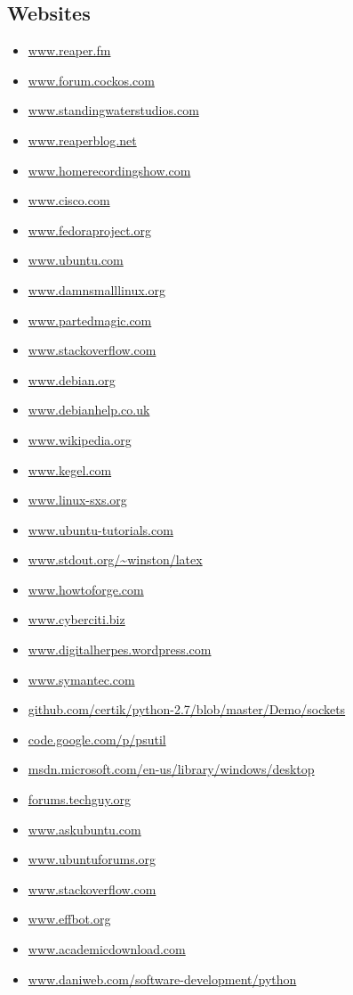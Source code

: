 \documentclass[DIV=calc]{scrartcl}
\begin{document}
\subsection{Websites}
\begin{itemize}
	\item \url{www.reaper.fm}
	\item \url{www.forum.cockos.com}
	\item \url{www.standingwaterstudios.com}
	\item \url{www.reaperblog.net}
	\item \url{www.homerecordingshow.com}
	\item \url{www.cisco.com}
	\item \url{www.fedoraproject.org}
	\item \url{www.ubuntu.com}
	\item \url{www.damnsmalllinux.org}
	\item \url{www.partedmagic.com}
	\item \url{www.stackoverflow.com}
	\item \url{www.debian.org}
	\item \url{www.debianhelp.co.uk}
	\item \url{www.wikipedia.org}
	\item \url{www.kegel.com}
	\item \url{www.linux-sxs.org}
	\item \url{www.ubuntu-tutorials.com}
	\item \url{www.stdout.org/~winston/latex}
	\item \url{www.howtoforge.com}
	\item \url{www.cyberciti.biz}
	\item \url{www.digitalherpes.wordpress.com}
	\item \url{www.symantec.com}
	\item \url{github.com/certik/python-2.7/blob/master/Demo/sockets}
	\item \url{code.google.com/p/psutil}
	\item \url{msdn.microsoft.com/en-us/library/windows/desktop}
	\item \url{forums.techguy.org}
	\item \url{www.askubuntu.com}
	\item \url{www.ubuntuforums.org}
	\item \url{www.stackoverflow.com}
	\item \url{www.effbot.org}
	\item \url{www.academicdownload.com}
	\item \url{www.daniweb.com/software-development/python}

\end{itemize}
\end{document}
